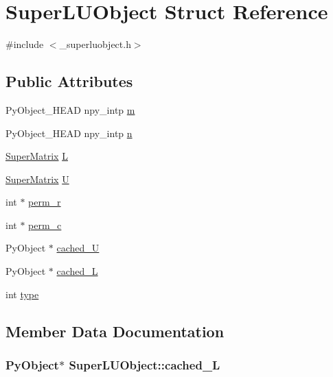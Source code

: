 \hypertarget{structSuperLUObject}{}\section{Super\+L\+U\+Object Struct Reference}
\label{structSuperLUObject}


{\ttfamily \#include $<$\+\_\+superluobject.\+h$>$}

\subsection*{Public Attributes}
\begin{DoxyCompactItemize}
\item 
Py\+Object\+\_\+\+H\+E\+A\+D npy\+\_\+intp \hyperlink{structSuperLUObject_acb3bde18ca1ad2d52a25b6cebb13815c}{m}
\item 
Py\+Object\+\_\+\+H\+E\+A\+D npy\+\_\+intp \hyperlink{structSuperLUObject_a6e09338960b1bf08f182e57f911b177d}{n}
\item 
\hyperlink{structSuperMatrix}{Super\+Matrix} \hyperlink{structSuperLUObject_a6abfd81c3a98d9ece54b68a29d23e7a6}{L}
\item 
\hyperlink{structSuperMatrix}{Super\+Matrix} \hyperlink{structSuperLUObject_a8539c48c219ad878e1b42ceebe7e1b2d}{U}
\item 
int $\ast$ \hyperlink{structSuperLUObject_ab0fd3683677756df1a061ab36e4e789f}{perm\+\_\+r}
\item 
int $\ast$ \hyperlink{structSuperLUObject_a1344cc29fdc5a17e7e0d6dc8f2d6539a}{perm\+\_\+c}
\item 
Py\+Object $\ast$ \hyperlink{structSuperLUObject_aff679a8d53ae5317eb38b8d7ea0eedd9}{cached\+\_\+\+U}
\item 
Py\+Object $\ast$ \hyperlink{structSuperLUObject_a835448093299a990256aeae3bcecff62}{cached\+\_\+\+L}
\item 
int \hyperlink{structSuperLUObject_ab7115b0b14b43b9acc2c5f2114fe7a47}{type}
\end{DoxyCompactItemize}


\subsection{Member Data Documentation}
\hypertarget{structSuperLUObject_a835448093299a990256aeae3bcecff62}{}
\subsubsection[{cached\+\_\+\+L}]{\setlength{\rightskip}{0pt plus 5cm}Py\+Object$\ast$ Super\+L\+U\+Object\+::cached\+\_\+\+L}\label{structSuperLUObject_a835448093299a990256aeae3bcecff62}
\hypertarget{structSuperLUObject_aff679a8d53ae5317eb38b8d7ea0eedd9}{}
